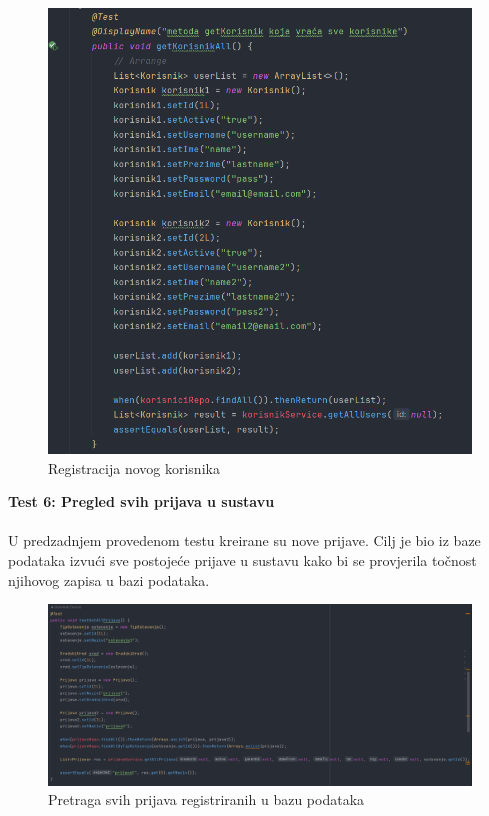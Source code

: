 			\begin{figure}[H]
			\includegraphics[scale=0.5]{slike/allUsers.PNG} %
			\centering
			\caption{Registracija novog korisnika}
			\label{fig:implementacija}
		\end{figure}
		
		\textbf{Test 6: Pregled svih prijava u sustavu}\\
			\\ U predzadnjem provedenom testu kreirane su nove prijave. Cilj je bio iz baze podataka izvući sve postojeće prijave u sustavu kako bi se provjerila točnost njihovog zapisa u bazi podataka.
			
			\begin{figure}[H]
			\includegraphics[scale=0.5]{slike/svePrijave.PNG} %
			\centering
			\caption{Pretraga svih prijava registriranih u bazu podataka}
			\label{fig:implementacija}
		\end{figure}
		
